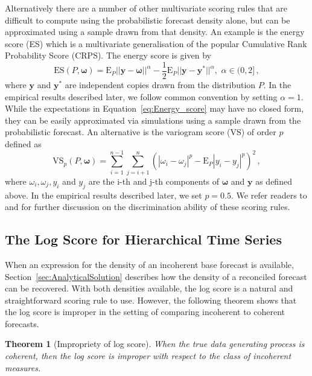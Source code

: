 \documentclass[a4paper,12pt]{article}
\def\E{\text{E}}
\newtheorem{theo}{Theorem}[section]
\theoremstyle{definition}
\begin{document}
Alternatively there are a number of other multivariate scoring rules that are difficult to compute using the probabilistic forecast density alone, but can be approximated using a sample drawn from that density. An example is the energy score (ES) \citep[see][for details]{Gneiting2007} which is a multivariate generalisation of the popular Cumulative Rank Probability Score (CRPS). The energy score is given by
\begin{equation}\label{eq:Energy_score}
\text{ES}(P,\bm{\omega}) =
\E_{P}
||{\bm{y}}-\bm{\omega}||^\alpha -\frac{1}{2}\E_{P}||\bm{y}-\bm{y}^*||^\alpha, \,\, \alpha \in (0,2]\,,
\end{equation}
where $\bm{y}$ and $\bm{y}^*$ are independent copies drawn from the distribution $P$. In the empirical results described later, we follow common convention by setting $\alpha=1$. While the expectations in Equation~\eqref{eq:Energy_score} may have no closed form, they can be easily approximated via simulations using a sample drawn from the probabilistic forecast. {\color{red}An alternative is the variogram score (VS) of order $p$ \citep[see][for details]{SCHEUERER2015} defined as
\begin{equation}\label{eq:VS}
\text{VS}_p(P,\bm{\omega}) =
\sum_{i=1}^{n-1}\sum_{j=i+1}^{n}(|\omega_{i}-\omega_{j}|^p-\E_{P}|y_i-y_j|^p)^2\,,
\end{equation}
where $\omega_{i},\omega_{j}, y_i$ and $y_j$ are the i-th and j-th components of $\bm{\omega}$ and $\bm{y}$ as defined above. In the empirical results described later, we set $p=0.5$. We  refer readers to \cite{AleEtAl2021} and \cite{BjeEtAl2021} for further discussion on the discrimination ability of these scoring rules.}

\subsection{The Log Score for Hierarchical Time Series}

When an expression for the density of an incoherent base forecast is available, Section~\ref{sec:AnalyticalSolution} describes how the density of a reconciled forecast can be recovered. With both densities available, the log score is a natural and straightforward scoring rule to use. However, the following theorem shows that the log score is improper in the setting of comparing incoherent to coherent forecasts.

\begin{theo}[Impropriety of log score]\label{theo:logS_improp}
	When the true data generating process is coherent, then the log score is improper with respect to the class of incoherent measures.
\end{theo}
\end{document}
